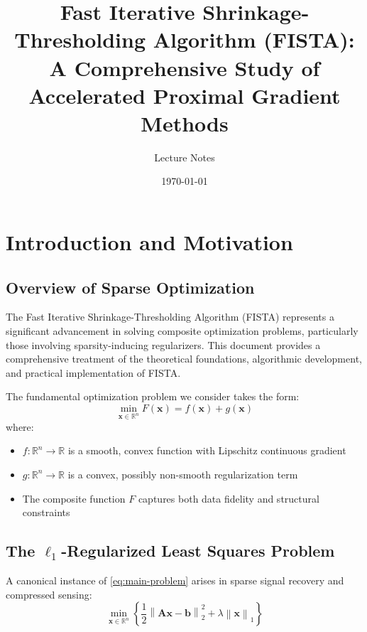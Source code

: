 \documentclass[12pt]{article}
\title{Fast Iterative Shrinkage-Thresholding Algorithm (FISTA):\\
A Comprehensive Study of Accelerated Proximal Gradient Methods}
\author{Lecture Notes}
\date{\today}
\renewcommand{\vec}[1]{\mathbf{#1}}
\newcommand{\norm}[1]{\left\lVert#1\right\rVert}
\newcommand{\R}{\mathbb{R}}
\begin{document}
\maketitle

\tableofcontents
\newpage

\section{Introduction and Motivation}

\subsection{Overview of Sparse Optimization}

The Fast Iterative Shrinkage-Thresholding Algorithm (FISTA) represents a significant advancement in solving composite optimization problems, particularly those involving sparsity-inducing regularizers. This document provides a comprehensive treatment of the theoretical foundations, algorithmic development, and practical implementation of FISTA.

The fundamental optimization problem we consider takes the form:
\begin{equation}\label{eq:main-problem}
    \min_{\vec{x} \in \R^n} F(\vec{x}) = f(\vec{x}) + g(\vec{x})
\end{equation}
where:
\begin{itemize}
    \item $f: \R^n \to \R$ is a smooth, convex function with Lipschitz continuous gradient
    \item $g: \R^n \to \R$ is a convex, possibly non-smooth regularization term
    \item The composite function $F$ captures both data fidelity and structural constraints
\end{itemize}

\subsection{The $\ell_1$-Regularized Least Squares Problem}

A canonical instance of \eqref{eq:main-problem} arises in sparse signal recovery and compressed sensing:
\begin{equation}\label{eq:l1-problem}
    \min_{\vec{x} \in \R^n} \left\{ \frac{1}{2}\norm{\vec{A}\vec{x} - \vec{b}}_2^2 + \lambda\norm{\vec{x}}_1 \right\}
\end{equation}
\end{document}
